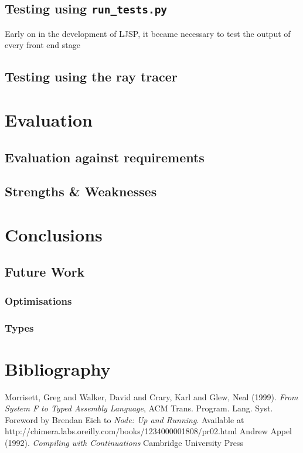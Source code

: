\documentclass[11pt]{report}
\begin{document}
\section{Testing using \texttt{run_tests.py}}
Early on in the development of LJSP, it became necessary to test the output of every front end stage 
\section{Testing using the ray tracer}


\chapter{Evaluation}
\section{Evaluation against requirements}
\section{Strengths \& Weaknesses}

\chapter{Conclusions}
\section{Future Work}
\subsection{Optimisations}
\subsection{Types}

\newpage

\chapter{Bibliography}
\begin{thebibliography}{1}
   Morrisett, Greg and Walker, David and Crary, Karl and Glew, Neal (1999). {\em From System F to Typed Assembly Language}, ACM Trans. Program. Lang. Syst.
     Foreword by Brendan Eich to {\em Node: Up and Running}. Available at http://chimera.labs.oreilly.com/books/1234000001808/pr02.html
     Andrew Appel (1992). {\em Compiling with Continuations} Cambridge University Press
\end{thebibliography}
\end{document}
